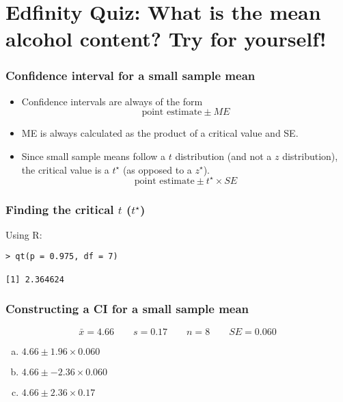 \documentclass[slidestop,compress,mathserif]{beamer}
\newcommand{\soln}[1]{\textit{#1}}
\begin{document}

\section{Edfinity Quiz: What is the mean alcohol content? Try for yourself!}



\begin{frame}
\frametitle{Confidence interval for a small sample mean}

\begin{itemize}
\item Confidence intervals are always of the form
\[ \text{point estimate} \pm {ME} \]
\pause
\item ME is always calculated as the product of a critical value and SE.
\pause
\item Since small sample means follow a $t$ distribution (and not a $z$ distribution), the critical value is a $t^\star$ (as opposed to a $z^\star$).
\[ \text{point estimate} \pm t^{\star} \times SE \]
\end{itemize}
\end{frame}



\begin{frame}[fragile]
\frametitle{Finding the critical $t$ ($t^\star$)}

Using R:
\begin{verbatim}
> qt(p = 0.975, df = 7)

[1] 2.364624
\end{verbatim}
\end{frame}



\begin{frame}
\frametitle{Constructing a CI for a small sample mean}

\[ \bar{x} = 4.66 \qquad s = 0.17 \qquad n = 8 \qquad SE = 0.060 \]

{
\begin{enumerate}[(a)]
\item $4.66 \pm 1.96 \times 0.060$
\item $4.66 \pm -2.36 \times 0.060$
\item $4.66 \pm 2.36 \times 0.17$
\end{enumerate}
}
{
\soln{}
\vspace{0.25cm}
}

\end{frame}
\end{document}
